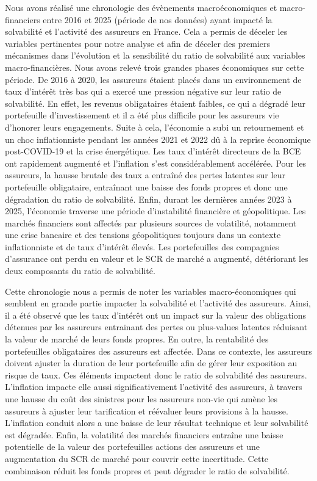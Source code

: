 \documentclass[
]{article}
\begin{document}
Nous avons réalisé une chronologie des évènements macroéconomiques et
macro-financiers entre 2016 et 2025 (période de nos données) ayant
impacté la solvabilité et l'activité des assureurs en France. Cela a
permis de déceler les variables pertinentes pour notre analyse et afin
de déceler des premiers mécanismes dans l'évolution et la sensibilité du
ratio de solvabilité aux variables macro-financières. Nous avons relevé
trois grandes phases économiques sur cette période. De 2016 à 2020, les
assureurs étaient placés dans un environnement de taux d'intérêt très
bas qui a exercé une pression négative sur leur ratio de solvabilité. En
effet, les revenus obligataires étaient faibles, ce qui a dégradé leur
portefeuille d'investissement et il a été plus difficile pour les
assureurs vie d'honorer leurs engagements. Suite à cela, l'économie a
subi un retournement et un choc inflationniste pendant les années 2021
et 2022 dû à la reprise économique post-COVID-19 et la crise
énergétique. Les taux d'intérêt directeurs de la BCE ont rapidement
augmenté et l'inflation s'est considérablement accélérée. Pour les
assureurs, la hausse brutale des taux a entraîné des pertes latentes sur
leur portefeuille obligataire, entraînant une baisse des fonds propres
et donc une dégradation du ratio de solvabilité. Enfin, durant les
dernières années 2023 à 2025, l'économie traverse une période
d'instabilité financière et géopolitique. Les marchés financiers sont
affectés par plusieurs sources de volatilité, notamment une crise
bancaire et des tensions géopolitiques toujours dans un contexte
inflationniste et de taux d'intérêt élevés. Les portefeuilles des
compagnies d'assurance ont perdu en valeur et le SCR de marché a
augmenté, détériorant les deux composants du ratio de solvabilité.

Cette chronologie nous a permis de noter les variables macro-économiques
qui semblent en grande partie impacter la solvabilité et l'activité des
assureurs. Ainsi, il a été observé que les taux d'intérêt ont un impact
sur la valeur des obligations détenues par les assureurs entrainant des
pertes ou plus-values latentes réduisant la valeur de marché de leurs
fonds propres. En outre, la rentabilité des portefeuilles obligataires
des assureurs est affectée. Dans ce contexte, les assureurs doivent
ajuster la duration de leur portefeuille afin de gérer leur exposition
au risque de taux. Ces éléments impactent donc le ratio de solvabilité
des assureurs. L'inflation impacte elle aussi significativement
l'activité des assureurs, à travers une hausse du coût des sinistres
pour les assureurs non-vie qui amène les assureurs à ajuster leur
tarification et réévaluer leurs provisions à la hausse. L'inflation
conduit alors a une baisse de leur résultat technique et leur
solvabilité est dégradée. Enfin, la volatilité des marchés financiers
entraîne une baisse potentielle de la valeur des portefeuilles actions
des assureurs et une augmentation du SCR de marché pour couvrir cette
incertitude. Cette combinaison réduit les fonds propres et peut dégrader
le ratio de solvabilité.
\end{document}
